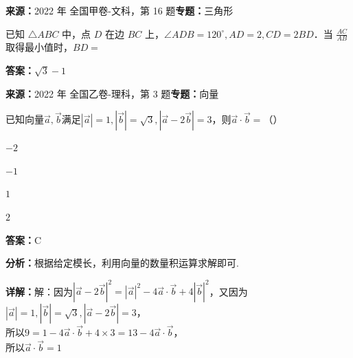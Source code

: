 \begin{question}[points=5]
\textbf{来源：}2022 年 全国甲卷-文科，第 16 题\quad \textbf{专题：}三角形\par
已知 $\triangle ABC$ 中，点 $D$ 在边 $BC$ 上，$\angle ADB=120^\circ, AD=2, CD=2BD$．当 $\frac{AC}{AB}$ 取得最小值时，$BD=$
\fillin[{$\sqrt{3}-1$}]
\begin{solution}
\textbf{答案：}$\sqrt{3}-1$
\end{solution}
\end{question}

\begin{question}[points=5]
\textbf{来源：}2022 年 全国乙卷-理科，第 3 题\quad \textbf{专题：}向量\par
已知向量$\vec{a}, \vec{b}$满足$|\vec{a}| = 1, |\vec{b}| = \sqrt{3}, |\vec{a} - 2\vec{b}| = 3$，则$\vec{a} \cdot \vec{b} =$（\qquad）
\begin{choices}
  \item $-2$
  \item $-1$
  \item $1$
  \item $2$
\end{choices}
\begin{solution}
\textbf{答案：}C

\textbf{分析：}根据给定模长，利用向量的数量积运算求解即可.

\textbf{详解：}解：因为$|\vec{a} - 2\vec{b}|^2 = |\vec{a}|^2 - 4\vec{a} \cdot \vec{b} + 4|\vec{b}|^2$，又因为$|\vec{a}| = 1, |\vec{b}| = \sqrt{3}, |\vec{a} - 2\vec{b}| = 3$，\\所以$9 = 1 - 4\vec{a} \cdot \vec{b} + 4 \times 3 = 13 - 4\vec{a} \cdot \vec{b}$，\\所以$\vec{a} \cdot \vec{b} = 1$
\end{solution}
\end{question}

